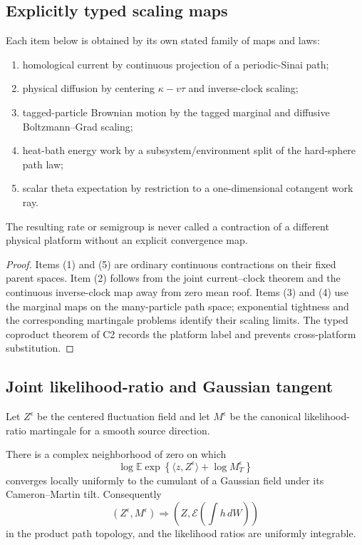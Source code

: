 \subsection{Explicitly typed scaling maps}

\begin{theorem}
\label{thm:rr2-d1-compiler}
Each item below is obtained by its own stated family of maps and laws:
\begin{enumerate}
\item homological current by continuous projection of a periodic-Sinai path;
\item physical diffusion by centering \(\kappa-v\tau\) and inverse-clock
scaling;
\item tagged-particle Brownian motion by the tagged marginal and diffusive
Boltzmann--Grad scaling;
\item heat-bath energy work by a subsystem/environment split of the hard-sphere
path law;
\item scalar theta expectation by restriction to a one-dimensional cotangent
work ray.
\end{enumerate}
The resulting rate or semigroup is never called a contraction of a different
physical platform without an explicit convergence map.
\end{theorem}

\begin{proof}
Items (1) and (5) are ordinary continuous contractions on their fixed parent
spaces.  Item (2) follows from the joint current--clock theorem and the
continuous inverse-clock map away from zero mean roof.  Items (3) and (4)
use the marginal maps on the many-particle path space; exponential tightness
and the corresponding martingale problems identify their scaling limits.
The typed coproduct theorem of C2 records the platform label and prevents
cross-platform substitution.
\end{proof}

\subsection{Joint likelihood-ratio and Gaussian tangent}

Let \(Z^\epsilon\) be the centered fluctuation field and let
\(M^\epsilon\) be the canonical likelihood-ratio martingale for a smooth
source direction.

\begin{theorem}
\label{thm:rr2-d1-modgaussian}
There is a complex neighborhood of zero on which
\[
 \log\mathbb E
 \exp\left\{
 \langle z,Z^\epsilon\rangle+
 \log M_T^\epsilon
 \right\}
\]
converges locally uniformly to the cumulant of a Gaussian field under its
Cameron--Martin tilt.  Consequently
\[
 (Z^\epsilon,M^\epsilon)
 \Longrightarrow
 \left(Z,\mathcal E\!\left(\int h\,dW\right)\right)
\]
in the product path topology, and the likelihood ratios are uniformly
integrable.
\end{theorem}


